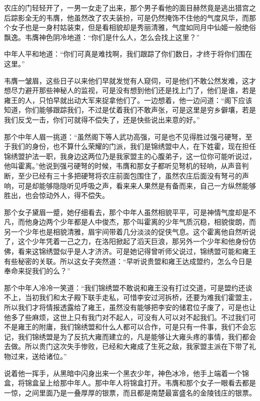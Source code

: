 农庄的门轻轻开了，一男一女走了出来，那个男子看他的面目赫然竟是逃出猎宫之后踪影全无的韦膺，他虽然改了农夫装扮，可是仍然掩饰不住他的气度风华，而那个女子也是一身村姑装束，但是看相貌却是秀丽清雅，气度如同月中仙姬一般绝俗飘逸。韦膺神色阴冷地道：“你们是什么人，怎么会找上这里？”

中年人平和地道：“你们可真是难找啊，我们跟踪了你们数日，才终于将你们围在这里。”

韦膺一皱眉，这些日子以来他们早就发觉有人窥伺，可是他们不敢公然发难，这才想尽力避开那些神秘人的监视，可是没有想到他们还是找上门了，他们是谁，若是雍王的人，只怕早就出动大军来捉拿他们了。一边想着，他一边问道：“阁下应该知道，你们能够跟踪我们，不过是仗着我们不敢声张，可是这里是穷乡僻壤，若是我们反戈一击，你们可就得不偿失了，还是快些说出来意的好。”

那个中年人眉一挑道：“虽然阁下等人武功高强，可是也不见得胜过强弓硬弩，至于我们的身份，也不算什么荣耀的门派，我们是锦绣盟中人，在下姓霍，现在担任锦绣盟护法一职，我身边这两位乃是我家盟主的心腹弟子，这一位你可能听说过，他叫霍离。”他说到强弓硬弩的时候，韦膺和那女子都听见弩机的轻响，从声音判断，至少已经有三十多把硬弩将农庄前面包围住了，虽然农庄后面没有弩弓的声响，可是却能够隐隐听见呼吸之声，看来来人果然是有备而来，自己一方纵然能够胜出，也会惊动外人，得不偿失。

那个女子黛眉一蹙，她仔细看去，那个中年人虽然相貌平平，可是神情气度却是不凡，而他身边两个少年都是人中俊杰，那个叫霍离的少年气质沉稳，相貌俊朗，而另一个少年也是相貌清雅，眉宇间带着几分淡淡的促侠气息。这个霍离他自然听说了，这个少年凭着一己之力，在洛阳掀起了滔天巨浪，那另外一个少年和他身份仿佛，看来这锦绣盟似乎是人才济济。可是她记得曾听师父说过，锦绣盟可能和雍王有些秘密的关联。所以这女子突然道：“早听说贵盟和雍王达成盟约，怎么今日是奉命来捉我们的么？”

那个中年人冷冷一笑道：“我们锦绣盟不敢说和雍王没有打过交道，可是盟约还谈不上，当初我们和太子殿下联手走私，可惜李安过河拆桥，还要为难我们霍盟主，所以我们才将情报透露给了雍王，虽然没有能够把李安的储君位子废了，可是也让他多了些麻烦，这世上只有我门对不起人，可没有人可以对不起我们。不过我们可不是雍王的附庸，我们锦绣盟和什么人都可以合作，可是只有一件事，我们不会忘记，我们锦绣盟是为了反抗大雍而建立的，凡是能够让大雍头疼的事情，我们都会去做。所以贵门这次失手惨败，已经和大雍成了生死之敌，我家盟主派在下带了礼物过来，送给诸位。”

说着他一挥手，从黑暗中闪身出来一个黑衣少年，神色冰冷，他手上端着一个锦盒，将锦盒呈上给那中年人。那中年人将锦盒打开。韦膺和那个女子一眼看去都是一惊，之间里面乃是一叠厚厚的银票，而且都是南楚最富盛名的金陵钱庄的银票。

